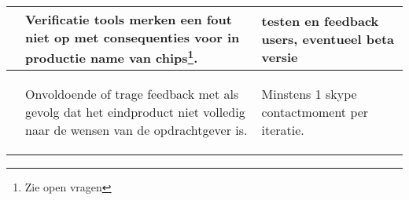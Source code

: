 \begin{center}
\begin{supertabular}{|c|p{23em}|p{13em}|}
		\\\hline
		& Verificatie tools merken een fout niet op met consequenties voor
		  in productie name van chips\footnote{Zie open vragen}.
		& testen en feedback users, eventueel beta versie
		\\\hline
		& \begin{aanpassing1}Onvoldoende of trage feedback 
		met als gevolg dat het eindproduct niet volledig 
		naar de wensen van de opdrachtgever is.\end{aanpassing1}
		& \begin{aanpassing1}Minstens 1 skype contactmoment per iteratie.
		\end{aanpassing1}
		\\\hline
        \end{supertabular}
\end{center}


